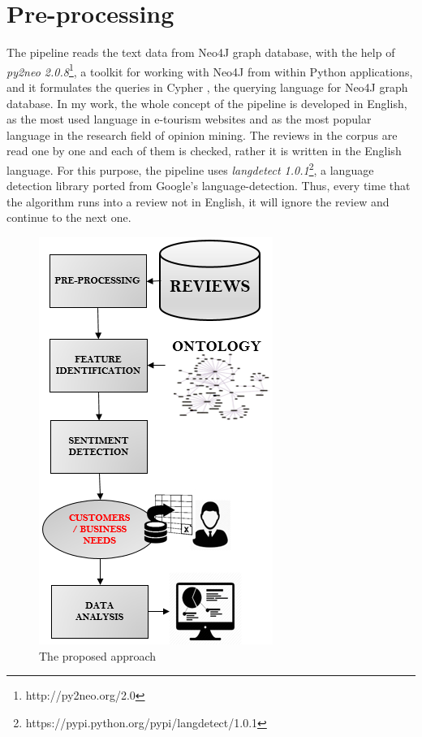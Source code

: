 \section{Pre-processing}
%
The pipeline reads the text data from  Neo4J graph database, with the help of \textit{py2neo 2.0.8}\footnote{http://py2neo.org/2.0}, a toolkit for working with Neo4J from within Python applications, and it formulates the queries in Cypher \cite{panzarino2014learning}, the querying language for Neo4J graph database. In my work, the whole concept of the pipeline is developed in English, as the most used language in e-tourism websites and as the most popular language in the research field of opinion mining. The reviews in the corpus are read one by one and each of them is checked, rather it is written in the English language. For this purpose, the pipeline uses \textit{langdetect 1.0.1}\footnote{https://pypi.python.org/pypi/langdetect/1.0.1}, a language detection library ported from Google's language-detection. Thus, every time that the algorithm runs into a review not in English, it will ignore the review and continue to the next one. 
\begin{figure}[h!]
	\centering
	\includegraphics[height=0.5\textheight]{pipe}
	\caption{The proposed approach}
	\label{fig:pipe}
\end{figure} 
